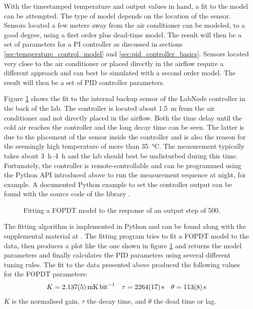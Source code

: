 With the timestamped temperature and output values in hand, a fit to the model can be attempted. The type of model depends on the location of the sensor. Sensors located a few meters away from the air conditioner can be modeled, to a good degree, using a first order plus dead-time model. The result will then be a set of parameters for a PI controller as discussed in sections \ref{sec:temperature_control_model} and \ref{sec:pid_controller_basics}. Sensors located very close to the air conditioner or placed directly in the airflow require a different approach and can best be simulated with a second order model. The result will then be a set of PID controller parameters.

Figure \ref{fig:pid_parameter_fit} shows the fit to the internal backup sensor of the LabNode controller in the back of the lab. The controller is located about \qty{1.5}{\m} from the air conditioner and not directly placed in the airflow. Both the time delay until the cold air reaches the controller and the long decay time can be seen. The latter is due to the placement of the sensor inside the controller and is also the reason for the seemingly high temperature of more than \qty{35}{\celsius}. The measurement typically takes about \qtyrange[range-units = single]{3}{4}{\hour} and the lab should best be undisturbed during this time. Fortunately, the controller is remote-controllable and can be programmed using the Python API introduced above to run the measurement sequence at night, for example. A documented Python example to set the controller output can be found with the source code of the library \cite{git_labnode}.
\begin{figure}[ht]
    \centering
    \caption{Fitting a FOPDT model to the response of an output step of \qty{500}{\bit}.}
    \label{fig:pid_parameter_fit}
\end{figure}

The fitting algorithm is implemented in Python and can be found along with the supplemental material \cite{supplemental_material} at . The fitting program tries to fit a FOPDT model to the data, then produces a plot like the one shown in figure \ref{fig:pid_parameter_fit} and returns the model parameters and finally calculates the PID parameters using several different tuning rules. The fit to the data presented above produced the following values for the FOPDT parameters:
\begin{align*}
    K = \qty{2.137(5)}{\milli \kelvin \per \bit}& & \tau = \qty{2264(17)}{\second}& &\theta = \qty{113(8)}{\second}
\end{align*}
$K$ is the normalised gain, $\tau$ the decay time, and $\theta$ the dead time or lag.

